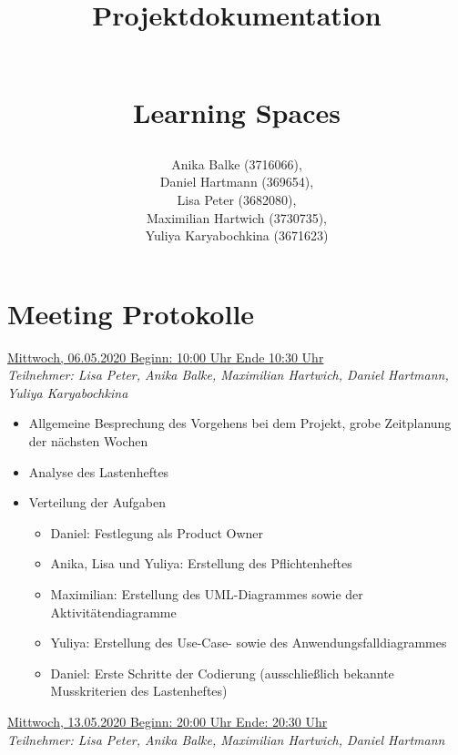 \documentclass[a4paper,report,headsepline]{scrreprt}
\begin{document}
\title{ \begin{Huge}
\textbf{Projektdokumentation}
\end{Huge} \\  \dq Learning Spaces\dq}
\author{Anika Balke (3716066),\\ Daniel Hartmann (369654),\\ Lisa Peter (3682080), \\ Maximilian Hartwich (3730735),\\ Yuliya Karyabochkina (3671623)}

\maketitle


\tableofcontents
\clearpage



\chapter{Meeting Protokolle}
\underline{{\large Mittwoch, 06.05.2020 Beginn: 10:00 Uhr Ende 10:30 Uhr}}  \\
\textit{Teilnehmer: Lisa Peter, Anika Balke, Maximilian Hartwich, Daniel Hartmann, Yuliya Karyabochkina}

 \begin{itemize}
  \item Allgemeine Besprechung des Vorgehens bei dem Projekt, grobe Zeitplanung der nächsten Wochen
 \item Analyse des Lastenheftes
 \item Verteilung der Aufgaben
 
 \begin{itemize}
 \item Daniel: Festlegung als Product Owner
 \item Anika, Lisa und Yuliya: Erstellung des Pflichtenheftes
 \item Maximilian: Erstellung des UML-Diagrammes sowie der Aktivitätendiagramme
 \item Yuliya: Erstellung des Use-Case- sowie des Anwendungsfalldiagrammes
 \item Daniel: Erste Schritte der Codierung (ausschließlich bekannte Musskriterien des Lastenheftes)
 
\end{itemize} 
\end{itemize}  
 \underline{{\large Mittwoch, 13.05.2020 Beginn: 20:00 Uhr Ende: 20:30 Uhr}}  \\
\textit{Teilnehmer: Lisa Peter, Anika Balke, Maximilian Hartwich, Daniel Hartmann}
\end{document}
